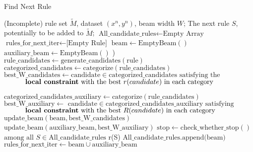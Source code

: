 \begin{algorithm}[ht]
\caption{Find Next Rule} \label{alg:find_next_rule}
\begin{algorithmic}[1]
\REQUIRE (Incomplete) rule set $\tilde{M}$, dataset $(x^n, y^n)$, beam width $W$;
\ENSURE The next rule $S$, potentially to be added to $\tilde{M}$;
\STATE $\text{All\_candidate\_rules} \leftarrow \text{Empty Array}$
\STATE $\text{rules\_for\_next\_iter} \leftarrow \text{[Empty Rule]}$ 
	\STATE $\text{beam} \leftarrow \text{EmptyBeam}()$ 
	\STATE $\text{auxiliary\_beam} \leftarrow \text{EmptyBeam}()$ )
		\STATE $\text{rule\_candidates} \leftarrow \text{generate\_candidates}(\text{rule})$
		\STATE $\text{categorized\_candidates} \leftarrow \text{categorize}(\text{rule\_candidates})$ 
		\STATE $\text{best\_W\_candidates} \leftarrow \text{candidate} \in \text{categorized\_candidates satisfying the }$ 
		\STATE $\,\,\,\,\,\,\,\,\,\,\,\,\,\,\,\, \text{ \textbf{local constraint} with the best }  r(candidate) \text{ in each category}$ 
		
		\STATE $\text{categorized\_candidates\_auxiliary} \leftarrow \text{categorize}(\text{rule\_candidates})$ 
		\STATE $\text{best\_W\_auxiliary} \leftarrow \text{ candidate} \in \text{categorized\_candidates\_auxiliary satisfying}$
		\STATE $\,\,\,\,\,\,\,\,\,\,\,\,\,\,\,\, \text{ \textbf{local constraint} with the best }  R(candidate) \text{ in each category}$  
		\STATE $\text{update\_beam} (\text{beam}, \text{best\_W\_candidates})$ 
		\STATE $\text{update\_beam} (\text{auxiliary\_beam}, \text{best\_W\_auxiliary})$ 
	\ENDFOR
	\STATE $\text{stop} \leftarrow \text{check\_whether\_stop}()$
		\STATE $\text{among all } S \in \text{All\_candidate\_rules}$
		\RETURN {} r(S)
	\ELSE
		\STATE $\text{All\_candidate\_rules.append(beam)}$
		\STATE $\text{rules\_for\_next\_iter} \leftarrow \text{beam} \cup \text{auxiliary\_beam}$
	\ENDIF
\ENDWHILE
\end{algorithmic}
\end{algorithm}

